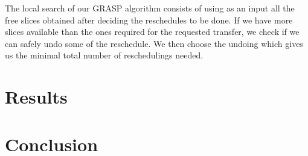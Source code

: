 \documentclass[11pt,a4paper]{article}
\begin{document}
The local search of our GRASP algorithm consists of using as an input all the free slices obtained after deciding the reschedules to be done. If we have more slices available than the ones required for the requested transfer, we check if we can safely undo some of the reschedule. We then choose the undoing which gives us the minimal total number of reschedulings needed.


\section{Results}
\section{Conclusion}
\end{document}
